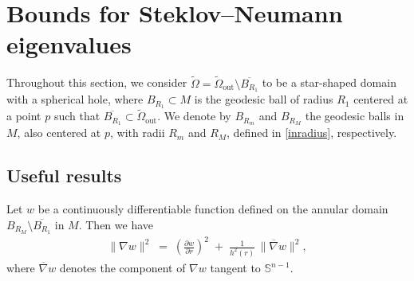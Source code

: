 \documentclass[12pt,reqno]{amsart}
\numberwithin{equation}{section}
\numberwithin{theorem}{section}
\numberwithin{equation}{section}
\numberwithin{theorem}{section}
\begin{document}
\section{Bounds for Steklov--Neumann eigenvalues}
Throughout this section, we consider $\tilde{\Omega} = \tilde{\Omega}_{\mathrm{out}} \setminus \overline{B_{R_1}}$ to be a star-shaped domain with a spherical hole, where $B_{R_1} \subset M$ is the geodesic ball of radius $R_1$ centered at a point $p$ such that $\overline{B_{R_1}} \subset\tilde{\Omega}_\mathrm{out}.$ We denote by $B_{R_m}$ and $B_{R_M}$ the geodesic balls in $M$, also centered at $p$, with radii $R_m$ and $R_M$, defined in \ref{inradius}, respectively.

\subsection{Useful results}
Let $w$ be a continuously differentiable function defined on the annular domain $B_{R_M}\setminus  \overline{B_{R_1}}$ in $M$. 
Then we have   
\begin{align*}
    \|\nabla w\|^2 \;=\; \left(\frac{\partial w}{\partial r}\right)^2 
\;+\; \frac{1}{h^2(r)} \,\|\overline{\nabla}w\|^2,
\end{align*}
where $\overline{\nabla}w$ denotes the component of $\nabla w$ tangent to $\mathbb{S}^{n-1}$.  
\end{document}

